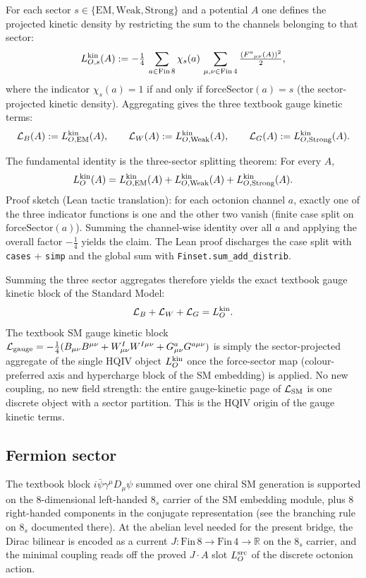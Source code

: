 \documentclass[11pt]{amsart}
\begin{document}
For each sector $s \in \{\mathrm{EM},\mathrm{Weak},\mathrm{Strong}\}$ and a potential $A$ one defines the projected kinetic density by restricting the sum to the channels belonging to that sector:
\[
L^{\rm kin}_{O,s}(A)
:= -\tfrac14\,\sum_{a\in\mathrm{Fin}\,8} \chi_s(a)\,
\sum_{\mu,\nu\in\mathrm{Fin}\,4}\tfrac{(F^a{}_{\mu\nu}(A))^2}{2},
\]
where the indicator $\chi_s(a)=1$ if and only if $\mathrm{forceSector}(a)=s$ (the sector-projected kinetic density). Aggregating gives the three textbook gauge kinetic terms:
\[
\mathcal{L}_B(A) := L^{\rm kin}_{O,{\rm EM}}(A),\qquad
\mathcal{L}_W(A) := L^{\rm kin}_{O,{\rm Weak}}(A),\qquad
\mathcal{L}_G(A) := L^{\rm kin}_{O,{\rm Strong}}(A).
\]

The fundamental identity is the three-sector splitting theorem:
For every $A$,
\[
L_O^{\rm kin}(A)
= L^{\rm kin}_{O,{\rm EM}}(A) + L^{\rm kin}_{O,{\rm Weak}}(A) + L^{\rm kin}_{O,{\rm Strong}}(A).
\]
Proof sketch (Lean tactic translation): for each octonion channel $a$, exactly one of the three indicator functions is one and the other two vanish (finite case split on $\mathrm{forceSector}(a)$). Summing the channel-wise identity over all $a$ and applying the overall factor $-\frac14$ yields the claim. The Lean proof discharges the case split with \texttt{cases} + \texttt{simp} and the global sum with \texttt{Finset.sum\_add\_distrib}.

Summing the three sector aggregates therefore yields the exact textbook gauge kinetic block of the Standard Model:
\[
\mathcal{L}_B + \mathcal{L}_W + \mathcal{L}_G = L_O^{\rm kin}.
\]
The textbook SM gauge kinetic block
$\mathcal{L}_{\rm gauge}=-\tfrac14(B_{\mu\nu}B^{\mu\nu}+W^I_{\mu\nu}W^{I\mu\nu}+G^a_{\mu\nu}G^{a\mu\nu})$
\cite{yang1954,tHooft1971,gross1973,peskin1995}
is simply the sector-projected aggregate of the single HQIV object $L_O^{\rm kin}$ once the force-sector map (colour-preferred axis and hypercharge block of the SM embedding) is applied. No new coupling, no new field strength: the entire gauge-kinetic page of $\mathcal{L}_{\rm SM}$ is one discrete object with a sector partition. This is the HQIV origin of the gauge kinetic terms.

\subsection{Fermion sector}

The textbook block $i\bar\psi\gamma^\mu D_\mu\psi$ summed over one chiral SM generation \cite{peskin1995,schwartz2014} is supported on the 8-dimensional left-handed $8_s$ carrier of the SM embedding module, plus 8 right-handed components in the conjugate representation (see the branching rule on $8_s$ documented there). At the abelian level needed for the present bridge, the Dirac bilinear is encoded as a current $J:\mathrm{Fin}\,8\to\mathrm{Fin}\,4\to\mathbb{R}$ on the $8_s$ carrier, and the minimal coupling reads off the proved $J\cdot A$ slot $L_O^{\rm src}$ of the discrete octonion action.
\end{document}
